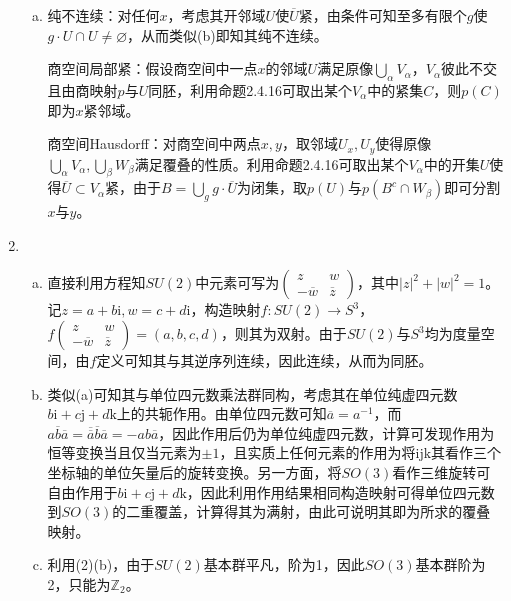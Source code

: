 \documentclass[a4paper,UTF8,fontset=windows]{ctexart}
\begin{document}
\begin{enumerate}[(1)]
\begin{enumerate}[(a)]
    \item
    纯不连续：对任何$x$，考虑其开邻域$U$使$\overline{U}$紧，由条件可知至多有限个$g$使$g\cdot U\cap U\ne\varnothing$，从而类似(b)即知其纯不连续。
    
    商空间局部紧：假设商空间中一点$x$的邻域$U$满足原像$\bigcup_\alpha V_\alpha$，$V_\alpha$彼此不交且由商映射$p$与$U$同胚，利用命题2.4.16可取出某个$V_\alpha$中的紧集$C$，则$p(C)$即为$x$紧邻域。
    
    商空间Hausdorff：对商空间中两点$x,y$，取邻域$U_x,U_y$使得原像$\bigcup_\alpha V_\alpha,\bigcup_\beta W_\beta$满足覆叠的性质。利用命题2.4.16可取出某个$V_\alpha$中的开集$U$使得$\overline{U}\subset V_\alpha$紧，由于$B=\bigcup_gg\cdot\overline{U}$为闭集，取$p(U)$与$p(B^c\cap W_\beta)$即可分割$x$与$y$。
    \end{enumerate}
    
    \item
    \begin{enumerate}[(a)]
    \item
    直接利用方程知$SU(2)$中元素可写为$\begin{pmatrix}z&w\\-\overline{w}&\overline{z}\end{pmatrix}$，其中$|z|^2+|w|^2=1$。记$z=a+b\mathrm{i},w=c+d\mathrm{i}$，构造映射$f:SU(2)\to S^3$，$f\begin{pmatrix}z&w\\-\overline{w}&\overline{z}\end{pmatrix}=(a,b,c,d)$，则其为双射。由于$SU(2)$与$S^3$均为度量空间，由$f$定义可知其与其逆序列连续，因此连续，从而为同胚。
    
    \item
    类似(a)可知其与单位四元数乘法群同构，考虑其在单位纯虚四元数$b\mathrm{i}+c\mathrm{j}+d\mathrm{k}$上的共轭作用。由单位四元数可知$\overline{a}=a^{-1}$，而$\overline{ab\overline{a}}=\overline{\overline{a}}\overline{b}\overline{a}=-ab\overline{a}$，因此作用后仍为单位纯虚四元数，计算可发现作用为恒等变换当且仅当元素为$\pm1$，且实质上任何元素的作用为将$\mathrm{ijk}$其看作三个坐标轴的单位矢量后的旋转变换。另一方面，将$SO(3)$看作三维旋转可自由作用于$b\mathrm{i}+c\mathrm{j}+d\mathrm{k}$，因此利用作用结果相同构造映射可得单位四元数到$SO(3)$的二重覆盖，计算得其为满射，由此可说明其即为所求的覆叠映射。
    
    \item
    利用(2)(b)，由于$SU(2)$基本群平凡，阶为1，因此$SO(3)$基本群阶为2，只能为$\mathbb{Z}_2$。
    \end{enumerate}    
\end{enumerate}
\end{document}

